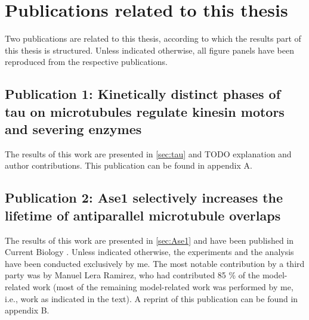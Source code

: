 \chapter{Publications related to this thesis}
\label{chap:publications}
Two publications are related to this thesis, according to which the results part of this thesis is structured. Unless indicated otherwise, all figure panels have been reproduced from the respective publications.
\section{Publication 1: Kinetically distinct phases of tau on microtubules regulate kinesin motors and severing enzymes}
The results of this work are presented in \autoref{sec:tau} and 
TODO explanation and author contributions.
This publication can be found in appendix A.
\section{Publication 2: Ase1 selectively increases the lifetime of antiparallel microtubule overlaps}
The results of this work are presented in \autoref{sec:Ase1} and have been published in Current Biology \parencite{Krattenmacher2024}. Unless indicated otherwise, the experiments and the analysis have been conducted exclusively by me. The most notable contribution by a third party was by Manuel Lera Ramirez, who had contributed 85 \% of the model-related work (most of the remaining model-related work was performed by me, i.e., work as indicated in the text). A reprint of this publication can be found in appendix B.